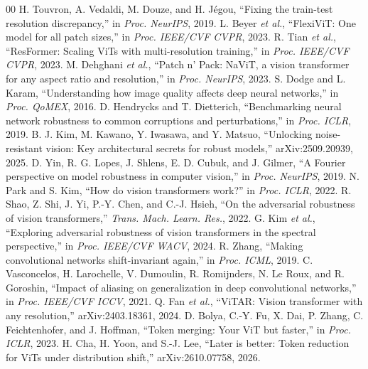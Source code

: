 \documentclass[conference]{IEEEtran}
\begin{document}
\begin{thebibliography}{00}
 H. Touvron, A. Vedaldi, M. Douze, and H. J\'egou, ``Fixing the train-test resolution discrepancy,'' in \emph{Proc. NeurIPS}, 2019.
 L. Beyer \emph{et al.}, ``FlexiViT: One model for all patch sizes,'' in \emph{Proc. IEEE/CVF CVPR}, 2023.
 R. Tian \emph{et al.}, ``ResFormer: Scaling ViTs with multi-resolution training,'' in \emph{Proc. IEEE/CVF CVPR}, 2023.
 M. Dehghani \emph{et al.}, ``Patch n' Pack: NaViT, a vision transformer for any aspect ratio and resolution,'' in \emph{Proc. NeurIPS}, 2023.
 S. Dodge and L. Karam, ``Understanding how image quality affects deep neural networks,'' in \emph{Proc. QoMEX}, 2016.
 D. Hendrycks and T. Dietterich, ``Benchmarking neural network robustness to common corruptions and perturbations,'' in \emph{Proc. ICLR}, 2019.
 B. J. Kim, M. Kawano, Y. Iwasawa, and Y. Matsuo, ``Unlocking noise-resistant vision: Key architectural secrets for robust models,'' arXiv:2509.20939, 2025.
 D. Yin, R. G. Lopes, J. Shlens, E. D. Cubuk, and J. Gilmer, ``A Fourier perspective on model robustness in computer vision,'' in \emph{Proc. NeurIPS}, 2019.
 N. Park and S. Kim, ``How do vision transformers work?'' in \emph{Proc. ICLR}, 2022.
 R. Shao, Z. Shi, J. Yi, P.-Y. Chen, and C.-J. Hsieh, ``On the adversarial robustness of vision transformers,'' \emph{Trans. Mach. Learn. Res.}, 2022.
 G. Kim \emph{et al.}, ``Exploring adversarial robustness of vision transformers in the spectral perspective,'' in \emph{Proc. IEEE/CVF WACV}, 2024.
 R. Zhang, ``Making convolutional networks shift-invariant again,'' in \emph{Proc. ICML}, 2019.
 C. Vasconcelos, H. Larochelle, V. Dumoulin, R. Romijnders, N. Le Roux, and R. Goroshin, ``Impact of aliasing on generalization in deep convolutional networks,'' in \emph{Proc. IEEE/CVF ICCV}, 2021.
 Q. Fan \emph{et al.}, ``ViTAR: Vision transformer with any resolution,'' arXiv:2403.18361, 2024.
 D. Bolya, C.-Y. Fu, X. Dai, P. Zhang, C. Feichtenhofer, and J. Hoffman, ``Token merging: Your ViT but faster,'' in \emph{Proc. ICLR}, 2023.
 H. Cha, H. Yoon, and S.-J. Lee, ``Later is better: Token reduction for ViTs under distribution shift,'' arXiv:2610.07758, 2026.

\end{thebibliography}
\end{document}
